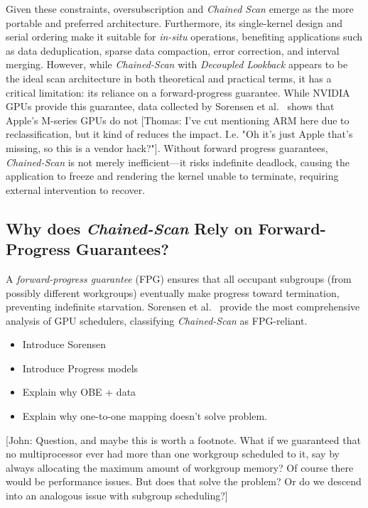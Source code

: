 \documentclass[sigconf]{acmart}
\newcommand{\thomas}[1]{{\footnotesize\color{orange}[Thomas: #1]}}
\newcommand{\john}[1]{{\footnotesize\color{cyan}[John: #1]}}
\begin{document}
Given these constraints, oversubscription and \emph{Chained Scan} emerge as the more portable and preferred architecture. Furthermore, its single-kernel design and serial ordering make it suitable for \emph{in-situ} operations, benefiting applications such as data deduplication, sparse data compaction, error correction, and interval merging. However, while \emph{Chained-Scan} with \emph{Decoupled Lookback} appears to be the ideal scan architecture in both theoretical and practical terms, it has a critical limitation: its reliance on a forward-progress guarantee. While NVIDIA GPUs provide this guarantee, data collected by Sorensen et al.~\cite{sorensen2021} shows that Apple’s M-series GPUs do not \thomas{I've cut mentioning ARM here due to reclassification, but it kind of reduces the impact. I.e. "Oh it's just Apple that's missing, so this is a vendor hack?"}. Without forward progress guarantees, \emph{Chained-Scan} is not merely inefficient---it risks indefinite deadlock, causing the application to freeze and rendering the kernel unable to terminate, requiring external intervention to recover.

\subsection{Why does \emph{Chained-Scan} Rely on Forward-Progress Guarantees?}
A \emph{forward-progress guarantee} (FPG) ensures that all occupant subgroups (from possibly different workgroups) eventually make progress toward termination, preventing indefinite starvation. Sorensen et al.~\cite{sorensen2018,sorensen2021} provide the most comprehensive analysis of GPU schedulers, classifying \emph{Chained-Scan} as FPG-reliant.
\begin{itemize}
  \item Introduce Sorensen
  \item Introduce Progress models
  \item Explain why OBE + data
  \item Explain why one-to-one mapping doesn't solve problem.
\end{itemize}

\john{Question, and maybe this is worth a footnote. What if we guaranteed that no multiprocessor ever had more than one workgroup scheduled to it, say by always allocating the maximum amount of workgroup memory? Of course there would be performance issues. But does that solve the problem? Or do we descend into an analogous issue with subgroup scheduling?}
\end{document}
